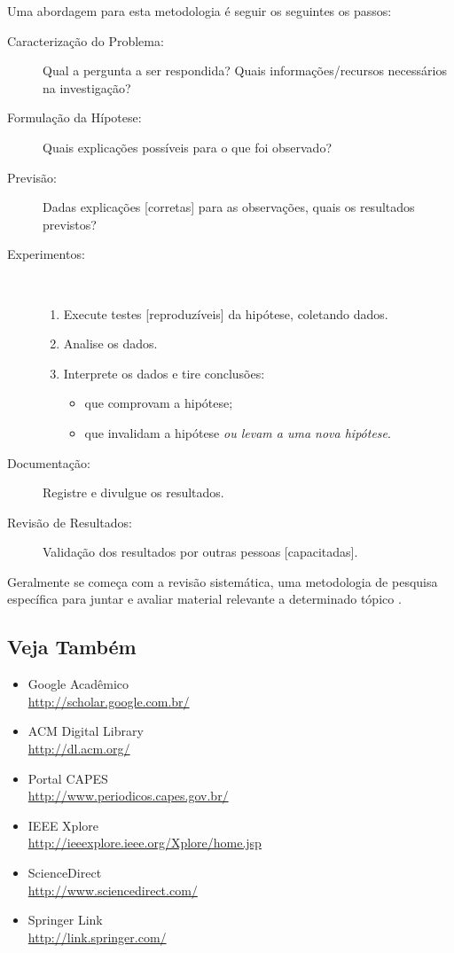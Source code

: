 Uma abordagem para esta metodologia é seguir os seguintes os passos:
\begin{description}
	\item[Caracterização do Problema:] Qual a pergunta a ser respondida? Quais 
informações/recursos necessários na investigação?
	\item[Formulação da Hípotese:] Quais explicações possíveis para o que foi observado?
	\item[Previsão:] Dadas explicações [corretas] para as observações, quais os 
	resultados previstos?
	\item[Experimentos:] \ \\\vspace{-2em} 
		\begin{enumerate}
			\item Execute testes [reproduzíveis] da hipótese, coletando dados.
			\item Analise os dados.
			\item Interprete os dados e tire conclusões:
				\begin{itemize}
				\item que comprovam a hipótese;
				\item que invalidam a hipótese \emph{ou levam a uma nova hipótese}.
				\end{itemize}
		\end{enumerate}
	\item[Documentação:] Registre e divulgue os resultados.
	\item[Revisão de Resultados:] Validação dos resultados por outras pessoas 
	[capacitadas].
\end{description}%

Geralmente se começa com a revisão sistemática, uma metodologia de pesquisa 
específica para juntar e avaliar material relevante a determinado tópico 
\cite{Biolchini_2005_Systematicreviewin}.

\subsection{Veja Também}
\begin{itemize}
	\item Google Acadêmico
		\\\url{http://scholar.google.com.br/}%
	\item ACM Digital Library
		\\\url{http://dl.acm.org/}%
	\item Portal CAPES
		\\\url{http://www.periodicos.capes.gov.br/}%
	\item IEEE Xplore
		\\\url{http://ieeexplore.ieee.org/Xplore/home.jsp}%
	\item ScienceDirect
		\\\url{http://www.sciencedirect.com/}%
	\item Springer Link
		\\\url{http://link.springer.com/}%
\end{itemize}

